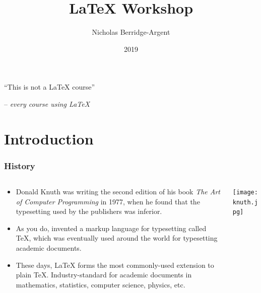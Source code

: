 \documentclass{beamer}
\author[Nick]{Nicholas Berridge-Argent}
\institute[StatSoc]{UNSW Society of Statistics}
\title{\LaTeX{} Workshop}
\date{2019}
\begin{document}

\begin{frame}
	\titlepage
\end{frame}

\begin{frame}
	\begin{center}
		{\Huge{}``This is not a \LaTeX{} course''}

		\hspace*{4cm}-- \textit{every course using \LaTeX}
	\end{center}
\end{frame}

\section{Introduction}

\begin{frame}
	\frametitle{History}
	\begin{columns}
		\begin{column}{0.48\textwidth}
			\begin{footnotesize}
				\begin{itemize}
					\item Donald Knuth was writing the second edition of his book \textit{The Art of Computer Programming} in 1977, when he found that the typesetting used by the publishers was inferior.
					\item As you do, invented a markup language for typesetting called TeX, which was eventually used around the world for typesetting academic documents.
					\item These days, \LaTeX{} forms the most commonly-used extension to plain TeX. Industry-standard for academic documents in mathematics, statistics, computer science, physics, etc.
				\end{itemize}
			\end{footnotesize}
		\end{column}
		\begin{column}{0.48\textwidth}
			\begin{center}
				\texttt{[image: knuth.jpg]}
			\end{center}
		\end{column}
	\end{columns}
\end{frame}
\end{document}
